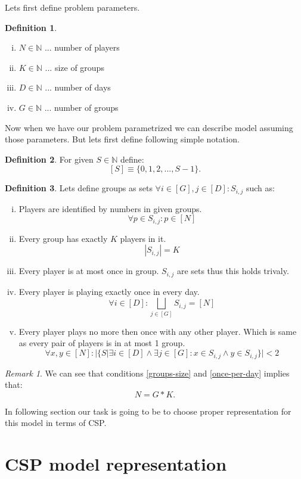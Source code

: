\documentclass[a4paper]{article}
\theoremstyle{definition}
\newtheorem{definition}{Definition}[section]
\theoremstyle{remark}
\newtheorem*{remark}{Remark}
\newcommand{\mdef}[2]{
	\theoremstyle{definition}
	\begin{definition}{#1}
	#2
	\end{definition}
}
\newcommand{\mins}[2]{
	\theoremstyle{remark}
	\begin{remark}{#1}
	#2
	\end{remark}
}
\begin{document}
Lets first define problem parameters.

\mdef{}{ 
	\begin{enumerate}[(i)]
		\item $ N \in \mathbb{N} $ ... number of players 
		\item $ K \in \mathbb{N} $ ... size of groups
		\item $ D \in \mathbb{N} $ ... number of days
		\item $ G \in \mathbb{N} $ ... number of groups
	\end{enumerate}
}

Now when we have our problem parametrized we can describe model assuming those parameters.
But lets first define following simple notation.
\mdef{}{
	For given $S \in \mathbb{N}$ define:
	$$ [S] \equiv \{0,1,2,...,S-1\}.  $$
 }

\mdef{}{ Lets define groups as sets $\forall i \in [G], j \in [D]: S_{i,j}$ such  as:
	\begin{enumerate}[(i)]
		\item Players are identified by numbers in given groups. $$\forall p \in S_{i,j}: p \in [N]$$ 
		\item\label{groups-size} Every group has exactly $K$ players in it. $$ |S_{i,j}| = K$$  
		\item\label{one-player} Every player is at most once in group. $S_{i,j}$ are sets thus this holds trivaly. 
		\item\label{once-per-day} Every player is playing exactly once in every day.  $$ \forall i \in [D]: \bigsqcup_{ j \in [G]} S_{i,j} = [N] $$
		\item\label{player-pairs} Every player plays no more then once with any other player. Which is same as every pair of players 
		is in at most 1 group.  $$ \forall x,y \in [N]: |\{S | \exists i \in [D] \land \exists j \in [G]: x \in S_{i,j} \land y \in S_{i,j}\}| < 2 $$
	\end{enumerate}  
}



\mins{}{ 
We can see that conditions \ref{groups-size} and \ref{once-per-day} implies that:
$$ N = G*K. $$
}\label{insight}


In following section our task is going to be to choose proper representation for this model in terms of CSP.



\section{CSP model representation}
% 
% 
% 
% 
\end{document}
